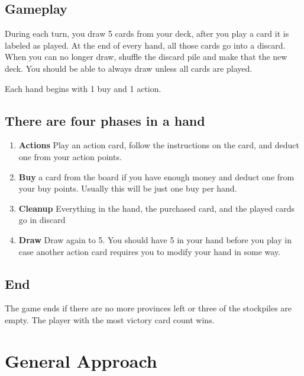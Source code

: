 \documentclass[11pt, oneside]{article}   	%
\begin{document}
\subsection{Gameplay}

During each turn, you draw 5 cards from your deck, after you play a card it is labeled as played. At the end of every hand, all those cards go into a discard. When you can no longer draw, shuffle the discard pile and make that the new deck. You should be able to always draw unless all cards are played. 

Each hand begins with 1 buy and 1 action. 


\subsection{There are four phases in a hand}

	\begin{enumerate}
 		 \item \textbf{Actions} Play an action card, follow the instructions on the card, and deduct one from your action points. 
  		 \item \textbf{Buy} a card from the board if you have enough money and deduct one from your buy points. Usually this will be just one buy per hand. 
		 \item \textbf{Cleanup} Everything in the hand, the purchased card, and the played cards go in discard
		 \item \textbf{Draw} Draw again to 5. You should have 5 in your hand before you play in case another action card requires you to modify your hand in some way. 
	\end{enumerate}


\subsection{End}

The game ends if there are no more provinces left or three of the stockpiles are empty. The player with the most victory card count wins. 

\section{General Approach}
\end{document}
